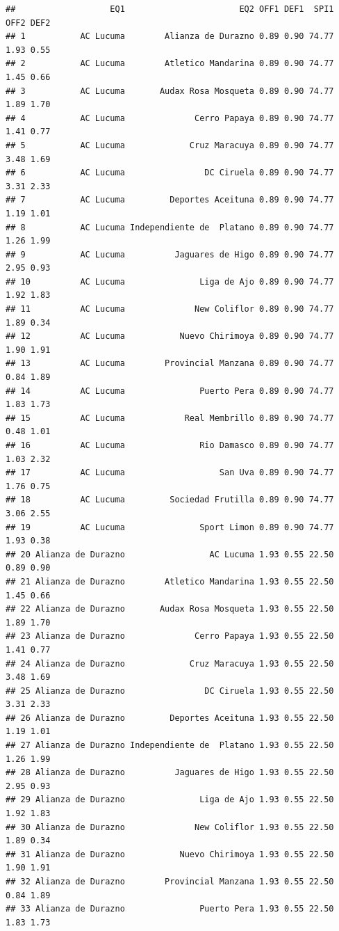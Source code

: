 \documentclass[]{article}
\begin{document}
\begin{verbatim}
##                   EQ1                       EQ2 OFF1 DEF1  SPI1 OFF2 DEF2
## 1           AC Lucuma        Alianza de Durazno 0.89 0.90 74.77 1.93 0.55
## 2           AC Lucuma        Atletico Mandarina 0.89 0.90 74.77 1.45 0.66
## 3           AC Lucuma       Audax Rosa Mosqueta 0.89 0.90 74.77 1.89 1.70
## 4           AC Lucuma              Cerro Papaya 0.89 0.90 74.77 1.41 0.77
## 5           AC Lucuma             Cruz Maracuya 0.89 0.90 74.77 3.48 1.69
## 6           AC Lucuma                DC Ciruela 0.89 0.90 74.77 3.31 2.33
## 7           AC Lucuma         Deportes Aceituna 0.89 0.90 74.77 1.19 1.01
## 8           AC Lucuma Independiente de  Platano 0.89 0.90 74.77 1.26 1.99
## 9           AC Lucuma          Jaguares de Higo 0.89 0.90 74.77 2.95 0.93
## 10          AC Lucuma               Liga de Ajo 0.89 0.90 74.77 1.92 1.83
## 11          AC Lucuma              New Coliflor 0.89 0.90 74.77 1.89 0.34
## 12          AC Lucuma           Nuevo Chirimoya 0.89 0.90 74.77 1.90 1.91
## 13          AC Lucuma        Provincial Manzana 0.89 0.90 74.77 0.84 1.89
## 14          AC Lucuma               Puerto Pera 0.89 0.90 74.77 1.83 1.73
## 15          AC Lucuma            Real Membrillo 0.89 0.90 74.77 0.48 1.01
## 16          AC Lucuma               Rio Damasco 0.89 0.90 74.77 1.03 2.32
## 17          AC Lucuma                   San Uva 0.89 0.90 74.77 1.76 0.75
## 18          AC Lucuma         Sociedad Frutilla 0.89 0.90 74.77 3.06 2.55
## 19          AC Lucuma               Sport Limon 0.89 0.90 74.77 1.93 0.38
## 20 Alianza de Durazno                 AC Lucuma 1.93 0.55 22.50 0.89 0.90
## 21 Alianza de Durazno        Atletico Mandarina 1.93 0.55 22.50 1.45 0.66
## 22 Alianza de Durazno       Audax Rosa Mosqueta 1.93 0.55 22.50 1.89 1.70
## 23 Alianza de Durazno              Cerro Papaya 1.93 0.55 22.50 1.41 0.77
## 24 Alianza de Durazno             Cruz Maracuya 1.93 0.55 22.50 3.48 1.69
## 25 Alianza de Durazno                DC Ciruela 1.93 0.55 22.50 3.31 2.33
## 26 Alianza de Durazno         Deportes Aceituna 1.93 0.55 22.50 1.19 1.01
## 27 Alianza de Durazno Independiente de  Platano 1.93 0.55 22.50 1.26 1.99
## 28 Alianza de Durazno          Jaguares de Higo 1.93 0.55 22.50 2.95 0.93
## 29 Alianza de Durazno               Liga de Ajo 1.93 0.55 22.50 1.92 1.83
## 30 Alianza de Durazno              New Coliflor 1.93 0.55 22.50 1.89 0.34
## 31 Alianza de Durazno           Nuevo Chirimoya 1.93 0.55 22.50 1.90 1.91
## 32 Alianza de Durazno        Provincial Manzana 1.93 0.55 22.50 0.84 1.89
## 33 Alianza de Durazno               Puerto Pera 1.93 0.55 22.50 1.83 1.73

\end{verbatim}
\end{document}
